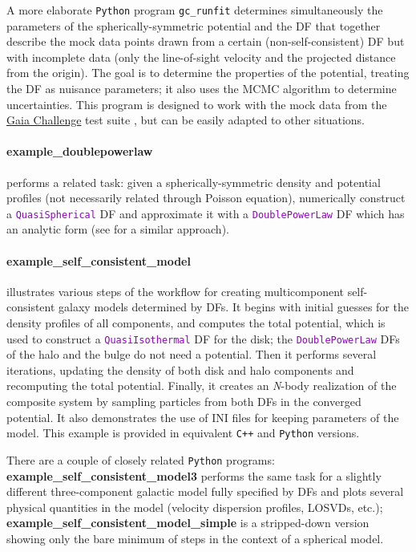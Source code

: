 \documentclass[12pt]{article}
\newcommand{\Nbody}{\textsl{N}-body\xspace}
\newcommand{\Cpp}  {\texttt{C++}\xspace}
\newcommand{\Python}{\texttt{Python}\xspace}
\newcommand{\ttt}[1]{\textcolor{darkviolet}{\texttt{#1}}}
\begin{document}
A more elaborate \Python program \texttt{gc_runfit} determines simultaneously the parameters of the spherically-symmetric potential and the DF that together describe the mock data points drawn from a certain (non-self-consistent) DF but with incomplete data (only the line-of-sight velocity and the projected distance from the origin). The goal is to determine the properties of the potential, treating the DF as nuisance parameters; it also uses the MCMC algorithm to determine uncertainties. 
This program is designed to work with the mock data from the \href{http://astrowiki.ph.surrey.ac.uk/dokuwiki/doku.php?id=tests:sphtri:spherical}{Gaia Challenge} test suite \cite{Read2020}, but can be easily adapted to other situations.

\paragraph{example_doublepowerlaw} performs a related task: given a spherically-symmetric density and potential profiles (not necessarily related through Poisson equation), numerically construct a \ttt{QuasiSpherical} DF and approximate it with a \ttt{DoublePowerLaw} DF which has an analytic form (see \cite{Jeffreson2017} for a similar approach).

\paragraph{example_self_consistent_model} illustrates various steps of the workflow for creating multicomponent self-consistent galaxy models determined by DFs. It begins with initial guesses for the density profiles of all components, and computes the total potential, which is used to construct a \ttt{QuasiIsothermal} DF for the disk; the \ttt{DoublePowerLaw} DFs of the halo and the bulge do not need a potential. Then it performs several iterations, updating the density of both disk and halo components and recomputing the total potential. Finally, it creates an \Nbody realization of the composite system by sampling particles from both DFs in the converged potential. It also demonstrates the use of INI files for keeping parameters of the model. This example is provided in equivalent \Cpp and \Python versions.

There are a couple of closely related \Python programs:\\
\textbf{example_self_consistent_model3} performs the same task for a slightly different three-component galactic model fully specified by DFs and plots several physical quantities in the model (velocity dispersion profiles, LOSVDs, etc.);\\
\textbf{example_self_consistent_model_simple} is a stripped-down version showing only the bare minimum of steps in the context of a spherical model.
\end{document}
